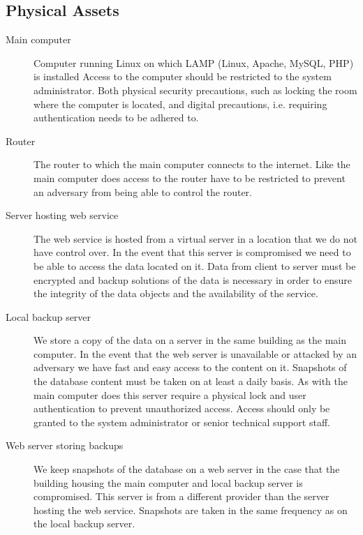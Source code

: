 \documentclass{article}
\begin{document}
\subsection*{Physical Assets}


\begin{description}
\item[Main computer] Computer running Linux on which LAMP (Linux, Apache, MySQL, PHP) is installed Access to the computer should be restricted to the system administrator. Both physical security precautions, such as locking the room where the computer is located, and digital precautions, i.e. requiring authentication needs to be adhered to.
 
\item[Router] The router to which the main computer connects to the internet. Like the main computer does access to the router have to be restricted to prevent an adversary from being able to control the router. 

\item[Server hosting web service] The web service is hosted from a virtual server in a location that we do not have control over. In the event that this server is compromised we need to be able to access the data located on it. Data from client to server must be encrypted and backup solutions of the data is necessary in order to ensure the integrity of the data objects and the availability of the service. 
 
\item[Local backup server]
We store a copy of the data on a server in the same building as the main computer. In the event that the web server is unavailable or attacked by an adversary we have fast and easy access to the content on it. Snapshots of the database content must be taken on at least a daily basis.  As with the main computer does this server require a physical lock and user authentication to prevent unauthorized access. Access should only be granted to the system administrator or senior technical support staff. 

\item[Web server storing backups]
We keep snapshots of the database on a web server in the case that the building housing the main computer and local backup server is compromised. This server is from a different provider than the server hosting the web service. Snapshots are taken in the same frequency as on the local backup server. 

\end{description}
	
\end{document}
